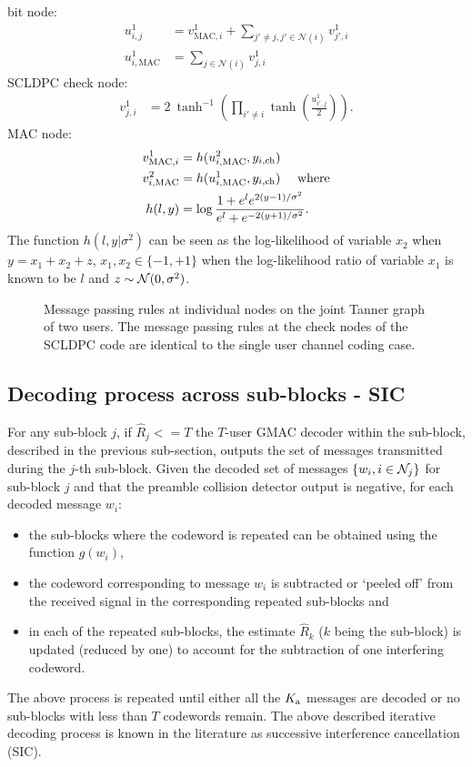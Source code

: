 bit node:
\begin{align*}
u^{1}_{i,j}&=v^{1}_{\text{MAC},i}+ \sum_{j'\neq j,j'\in \mathcal{N}(i)} v^{1}_{j',i}\\
u^{1}_{i,\text{MAC}}&=\sum_{j\in \mathcal{N}(i)} v^{1}_{j,i}
\end{align*}
SCLDPC check node:
\begin{align*}
v^{1}_{j,i}&=2~\tanh^{-1}\left( \prod_{i'\neq i} \tanh\left(\frac{u^{1}_{i',j}}{2}\right)\right).
\end{align*}
MAC node:
\begin{align}
v^{1}_{\text{MAC},i}&=h(u^{2}_{i,\text{MAC}},y_{i,\text{ch}})\label{Eqn:MACnodeBP} \\
v^{2}_{i,\text{MAC}}&=h(u^{1}_{i,\text{MAC}},y_{i,\text{ch}}) ~~~\text{ where}\notag\\
h(l,y)&=\log \frac{1+e^{l}e^{2(y-1)/\sigma^2}}{e^{l}+e^{-2(y+1)/\sigma^2}}.\notag
\end{align}
The function $h(l,y|\sigma^2)$ can be seen as the log-likelihood of variable $x_2$ when $y=x_1+x_2+z$, $x_1,x_2\in\{-1,+1\}$ when the log-likelihood ratio of variable $x_1$ is known to be $l$ and $z\sim \mathcal{N}(0,\sigma^2)$.
\begin{figure}[!ht]
  \centering
  \resizebox{0.75\textwidth}{!}{}
  \caption{ Message passing rules at individual nodes on the joint Tanner graph of two users. The message passing rules at the check nodes of the SCLDPC code are identical to the single user channel coding case.}
  \label{fig:BP_computationgraph}
\end{figure}


\subsection{Decoding process across sub-blocks - SIC}
For any sub-block $j$, if $\hat{R}_{j}<=T$ the $T$-user GMAC decoder within the sub-block, described in the previous sub-section, outputs the set of messages transmitted during the $j$-th sub-block. Given the decoded set of messages $\{w_i, i \in \mathcal{N}_j\}$ for sub-block $j$ and that the preamble collision detector output is negative, for each decoded message $w_i$:
\begin{itemize}
\item the sub-blocks where the codeword is repeated can be obtained using the function $g(w_i)$,
\item  the codeword corresponding to message $w_i$ is subtracted or `peeled off' from the received signal in the corresponding repeated sub-blocks and
\item  in each of the repeated sub-blocks, the estimate $\hat{R}_k$ ($k$ being the sub-block) is updated (reduced by one) to account for the subtraction of one interfering codeword.
\end{itemize} 
The above process is repeated until either all the $K_{\text{a}}$ messages are decoded or no sub-blocks with less than $T$ codewords remain. The above described iterative decoding process is known in the literature as successive interference cancellation (SIC). \\

